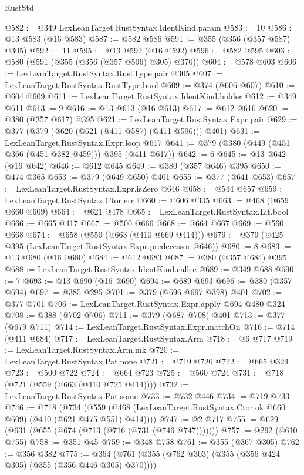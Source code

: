 \begin{lexlean}{RustStd}
\begin{coremodule}
@582 := @349 LexLeanTarget.RustSyntax.IdentKind.param
@583 := 10
@586 := @13 @583 (@16 @583)
@587 := @582 @586
@591 := @355 (@356 (@357 @587) @305)
@592 := 11
@595 := @13 @592 (@16 @592)
@596 := @582 @595
@603 := @580 (@591 (@355 (@356 (@357 @596) @305) @370))
@604 := @578 @603
@606 := LexLeanTarget.RustSyntax.RustType.pair @305
@607 := LexLeanTarget.RustSyntax.RustType.bool
@609 := @374 (@606 @607)
@610 := @604 @609
@611 := LexLeanTarget.RustSyntax.IdentKind.holder
@612 := @349 @611
@613 := 9
@616 := @13 @613 (@16 @613)
@617 := @612 @616
@620 := @380 (@357 @617) @395
@621 := LexLeanTarget.RustSyntax.Expr.pair
@629 := @377 (@379 (@620 (@621 (@411 @587) (@411 @596))) @401)
@631 := LexLeanTarget.RustSyntax.Expr.loop @617
@641 := @379 (@380 (@449 (@451 @366 (@451 @382 @459))) @395 (@411 @617))
@642 := 6
@645 := @13 @642 (@16 @642)
@646 := @612 @645
@649 := @380 (@357 @646) @395
@650 := @474 @365
@653 := @379 (@649 @650) @401
@655 := @377 (@641 @653)
@657 := LexLeanTarget.RustSyntax.Expr.isZero @646
@658 := @544 @657
@659 := LexLeanTarget.RustSyntax.Ctor.err
@660 := @606 @305
@663 := @468 (@659 @660 @609)
@664 := @621 @478
@665 := LexLeanTarget.RustSyntax.Lit.bool
@666 := @665 @417
@667 := @500 @666
@668 := @664 @667
@669 := @560 @668
@674 := @658 (@559 (@663 (@410 @669 @414)))
@679 := @379 (@425 @395 (LexLeanTarget.RustSyntax.Expr.predecessor @646))
@680 := 8
@683 := @13 @680 (@16 @680)
@684 := @612 @683
@687 := @380 (@357 @684) @395
@688 := LexLeanTarget.RustSyntax.IdentKind.callee
@689 := @349 @688
@690 := 7
@693 := @13 @690 (@16 @690)
@694 := @689 @693
@696 := @380 (@357 @694)
@697 := @385 @295
@701 := @379 (@696 @697 @398) @401
@702 := @377 @701
@706 := LexLeanTarget.RustSyntax.Expr.apply @694 @480 @324
@708 := @388 (@702 @706)
@711 := @379 (@687 @708) @401
@713 := @377 (@679 @711)
@714 := LexLeanTarget.RustSyntax.Expr.matchOn
@716 := @714 (@411 @684)
@717 := LexLeanTarget.RustSyntax.Arm
@718 := @6 @717
@719 := LexLeanTarget.RustSyntax.Arm.mk
@720 := LexLeanTarget.RustSyntax.Pat.none
@721 := @719 @720
@722 := @665 @324
@723 := @500 @722
@724 := @664 @723
@725 := @560 @724
@731 := @718 (@721 (@559 (@663 (@410 @725 @414))))
@732 := LexLeanTarget.RustSyntax.Pat.some
@733 := @732 @446
@734 := @719 @733
@746 := @718
    (@734 (@559 (@468 (LexLeanTarget.RustSyntax.Ctor.ok @660 @609) (@410 (@621 @475 @551) @414))))
@747 := @2 @717
@755 := @629 (@631 (@655 (@674 (@713 (@716 (@731 (@746 @747)))))))
@757 := @292 (@610 @755)
@758 := @351 @45
@759 := @348 @758
@761 := @355 (@367 @305)
@762 := @356 @382
@775 := @364 (@761 (@355 (@762 @303) (@355 (@356 @424 @305) (@355 (@356 @446 @305) @370))))

\end{coremodule}
\end{lexlean}
